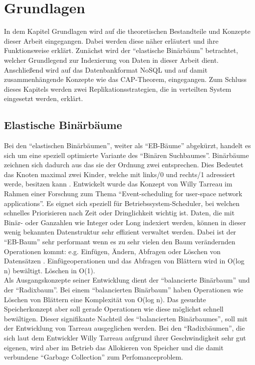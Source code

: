 \documentclass[a4paper,11pt,oneside,%
headsepline,												%
footsepline,												%
bibtotocnumbered									%
]{scrreprt}
\begin{document}
\chapter{Grundlagen}

In dem Kapitel Grundlagen wird auf die theoretischen Bestandteile und Konzepte dieser Arbeit eingegangen. Dabei werden diese näher erläutert und ihre Funktionsweise erklärt.
Zunächst wird der \enquote{elastische Binärbäum} betrachtet, welcher Grundlegend zur Indexierung von Daten in dieser Arbeit dient. Anschließend wird auf das Datenbankformat NoSQL und auf damit zusammenhängende Konzepte wie das CAP-Theorem, eingegangen. Zum Schluss dieses Kapitels werden zwei Replikationsstrategien, die in verteilten System eingesetzt werden, erklärt.   

\section{Elastische Binärbäume}
\label{sec:ebTreeGrundlagen}
Bei den \enquote{elastischen Binärbäumen}, weiter als \enquote{EB-Bäume} abgekürzt, handelt es sich um eine speziell optimierte Variante des \enquote{Binären Suchbaumes}. Binärbäume zeichnen sich dadurch aus das sie der Ordnung zwei entsprechen. Dies Bedeutet das Knoten maximal zwei Kinder, welche mit links/0 und rechts/1 adressiert werde, besitzen kann \autocite[251]{Ottmann2002}.
Entwickelt wurde das Konzept von Willy Tarreau \autocite{Tarreau} im Rahmen einer Forschung zum Thema \enquote{Event-scheduling for user-space network applications}. Es eignet sich speziell für Betriebssystem-Scheduler, bei welchen schnelles Priorisieren nach Zeit oder Dringlichkeit wichtig ist. Daten, die mit Binär- oder Ganzahlen wie Integer oder Long indexiert werden, können in dieser wenig bekannten Datenstruktur sehr effizient verwaltet werden. Dabei ist der \enquote{EB-Baum} sehr performant wenn es zu sehr vielen den Baum verändernden Operationen kommt: e.g. Einfügen, Ändern, Abfragen oder Löschen  von Datensätzen \autocite{Tarreau}.
Einfügeoperationen und das Abfragen von Blättern wird in O(log n) bewältigt. Löschen in O(1).\\

Als Ausgangskonzepte seiner Entwicklung dient der \enquote{balancierte Binärbaum} und der \enquote{Radixbaum}. Bei einem \enquote{balancierten Binärbaum} haben  Operationen wie Löschen von Blättern  eine Komplexität von O(log n). Das gesuchte Speicherkonzept aber soll gerade Operationen wie diese möglichst schnell bewältigen. Dieser signifikante Nachteil des \enquote{balancierten Binärbaumes}, soll mit der Entwicklung von Tarreau ausgeglichen werden. Bei den \enquote{Radixbäumen}, die sich laut dem Entwickler Willy Tarreau\autocite[Absatz Introduction]{Tarreau} aufgrund ihrer Geschwindigkeit sehr gut eigenen, wird aber im Betrieb das Allokieren von Speicher und die damit verbundene \enquote{Garbage Collection} zum Perfomanceproblem.\\
\end{document}
